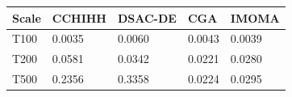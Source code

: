 \begin{tabular}{lllll}
\hline
Scale & CCHIHH & DSAC-DE & CGA & IMOMA \\
\hline
T100 & 0.0035 & 0.0060 & 0.0043 & 0.0039 \\
T200 & 0.0581 & 0.0342 & 0.0221 & 0.0280 \\
T500 & 0.2356 & 0.3358 & 0.0224 & 0.0295 \\
\hline
\end{tabular}
